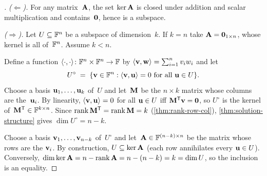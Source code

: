 \begin{proof}[]
\emph{($\Leftarrow$).} For any matrix~$\mathbf{A}$, the set
$\ker \mathbf{A}$ is closed under addition and scalar multiplication
and contains~$\mathbf{0}$, hence is a subspace.

\emph{($\Rightarrow$).} Let $U \subseteq \mathbb{F}^n$ be a subspace of
dimension~$k$. If $k = n$ take $\mathbf{A} = \mathbf{0}_{1 \times n}$, whose
kernel is all of~$\mathbb{F}^n$. Assume $k < n$.

Define a function
$\langle \cdot, \cdot \rangle\colon \mathbb{F}^n \times \mathbb{F}^n \to \mathbb{F}$ by
$\langle \mathbf{v}, \mathbf{w} \rangle = \sum_{i=1}^{n} v_i w_i$ and let
\[
  U^{\circ} \;=\; \{\mathbf{v} \in \mathbb{F}^n : \langle \mathbf{v}, \mathbf{u} \rangle = 0
  \text{ for all } \mathbf{u} \in U\}.
\]
Choose a basis $\mathbf{u}_1, \dots, \mathbf{u}_k$ of~$U$ and let~$\mathbf{M}$
be the $n \times k$ matrix whose columns are the~$\mathbf{u}_i$. By
linearity, $\langle \mathbf{v}, \mathbf{u} \rangle = 0$ for all
$\mathbf{u} \in U$ iff $\mathbf{M}^{\mathsf{T}} \mathbf{v} = \mathbf{0}$, so $U^{\circ}$ is
the kernel of~$\mathbf{M}^{\mathsf{T}} \in \mathbb{F}^{k \times n}$. Since
$\operatorname{rank} \mathbf{M}^{\mathsf{T}} = \operatorname{rank} \mathbf{M} = k$ (\cref{thm:rank-row-col}),
\cref{thm:solution-structure} gives $\dim U^{\circ} = n - k$.

Choose a basis $\mathbf{v}_1, \dots, \mathbf{v}_{n-k}$ of~$U^{\circ}$ and
let~$\mathbf{A} \in \mathbb{F}^{(n-k) \times n}$ be the matrix whose rows are the
$\mathbf{v}_i$. By construction, $U \subseteq \ker \mathbf{A}$ (each row
annihilates every $\mathbf{u} \in U$). Conversely,
$\dim \ker \mathbf{A} = n - \operatorname{rank} \mathbf{A} = n - (n - k) = k = \dim U$,
so the inclusion is an equality.
\end{proof}


